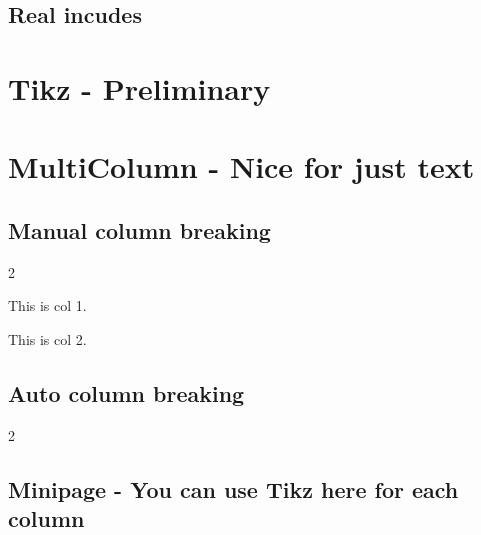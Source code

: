 \documentclass{article}
\begin{document}
\subsection{Real incudes}




\section{Tikz - Preliminary}


\newpage
\section{MultiColumn - Nice for just text}
\subsection{Manual column breaking}

\begin{multicols}{2}

    This is col 1.

    \lipsum[1]

    \columnbreak

    This is col 2.

    \lipsum[2]

\end{multicols}

\newpage
\subsection{Auto column breaking}

\begin{multicols}{2}

    \lipsum[1-3]

\end{multicols}

\newpage

\subsection{Minipage - You can use Tikz here for each column}
\end{document}

